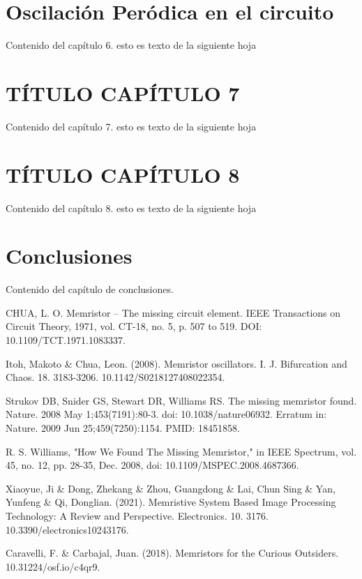 \documentclass[12pt,a4paper]{report} %
\begin{document}
	\chapter{Oscilación Peródica en el circuito}
	Contenido del capítulo 6.
	\newpage
	esto es texto de la siguiente hoja
	
	\chapter{TÍTULO CAPÍTULO 7}
	Contenido del capítulo 7.
	\newpage
	esto es texto de la siguiente hoja
	
	\chapter{TÍTULO CAPÍTULO 8}
	Contenido del capítulo 8.
	\newpage
	esto es texto de la siguiente hoja
	
	\chapter*{Conclusiones}
	Contenido del capítulo de conclusiones.
	\newpage
	
	
	\begin{thebibliography}{99}
		 CHUA, L. O. Memristor – The missing circuit element. IEEE
		Transactions on Circuit Theory, 1971, vol. CT-18, no. 5, p. 507 to
		519. DOI: 10.1109/TCT.1971.1083337.
		
		 Itoh, Makoto \& Chua, Leon. (2008). Memristor oscillators. I. J. Bifurcation and Chaos. 18. 3183-3206. 10.1142/S0218127408022354. 
		
		 Strukov DB, Snider GS, Stewart DR, Williams RS. The missing memristor found. Nature. 2008 May 1;453(7191):80-3. doi: 10.1038/nature06932. Erratum in: Nature. 2009 Jun 25;459(7250):1154. PMID: 18451858.
		
		 R. S. Williams, "How We Found The Missing Memristor," in IEEE Spectrum, vol. 45, no. 12, pp. 28-35, Dec. 2008, doi: 10.1109/MSPEC.2008.4687366.
		
		 Xiaoyue, Ji \& Dong, Zhekang \& Zhou, Guangdong \& Lai, Chun Sing \& Yan, Yunfeng \& Qi, Donglian. (2021). Memristive System Based Image Processing Technology: A Review and Perspective. Electronics. 10. 3176. 10.3390/electronics10243176. 
		
		 Caravelli, F. \& Carbajal, Juan. (2018). Memristors for the Curious Outsiders. 10.31224/osf.io/c4qr9. 
		
	\end{thebibliography}
	
\end{document}
